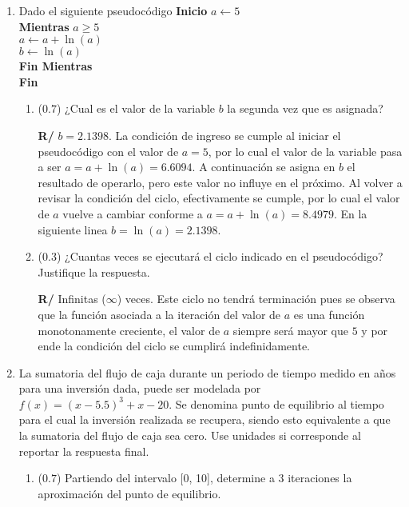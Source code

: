 \documentclass[12pt]{article}
\begin{document}
\vspace{-.5cm}
  \begin{enumerate}[leftmargin=*,widest=9]
    \item Dado el siguiente pseudocódigo
\textbf{Inicio}
\(a\gets 5\)\\
\textbf{Mientras} \(a \geq 5\)\\
\hspace*{1cm}\(a \gets a + \ln(a)\)\\
\hspace*{1cm}\(b \gets \ln(a) \)\\
\textbf{Fin Mientras}\\
\textbf{Fin}\\
    \begin{enumerate}[label=\alph*]
    \item (\(0.7\)) ¿Cual es el valor de la variable \(b\) la segunda vez que es asignada?

\textbf{R/} \(b=2.1398\). La condición de ingreso se cumple al iniciar el pseudocódigo con el valor de \(a = 5\), por lo cual el valor de la variable pasa a ser \(a = a + \ln(a) = 6.6094\). A continuación se asigna en \(b\) el resultado de operarlo, pero este valor no influye en el próximo. Al volver a revisar la condición del ciclo, efectivamente se cumple, por lo cual el valor de \(a\) vuelve a cambiar conforme a \(a= a+\ln(a) =  8.4979\). En la siguiente linea \(b = \ln(a) = 2.1398 \).
    \item (\(0.3\)) ¿Cuantas veces se ejecutará el ciclo indicado en el pseudocódigo? Justifique la respuesta.

\textbf{R/} Infinitas (\(\infty\)) veces. Este ciclo no tendrá terminación pues se observa que la función asociada a la iteración del valor de \(a\) es una función monotonamente creciente, el valor de \(a\) siempre será mayor que \(5\) y por ende la condición del ciclo se cumplirá indefinidamente.
    \end{enumerate}
    \item La sumatoria del flujo de caja durante un periodo de tiempo medido en años para una inversión dada, puede ser modelada por \(f(x) = (x-5.5)^3 + x - 20\). Se denomina punto de equilibrio al tiempo para el cual la inversión realizada se recupera, siendo esto equivalente a que la sumatoria del flujo de caja sea cero. Use unidades si corresponde al reportar la respuesta final.
    \begin{enumerate}[label=\alph*]
    \item (\(0.7\)) Partiendo del intervalo [0, 10], determine a 3 iteraciones la aproximación del punto de equilibrio.


\end{enumerate}
\end{enumerate}
\end{document}
